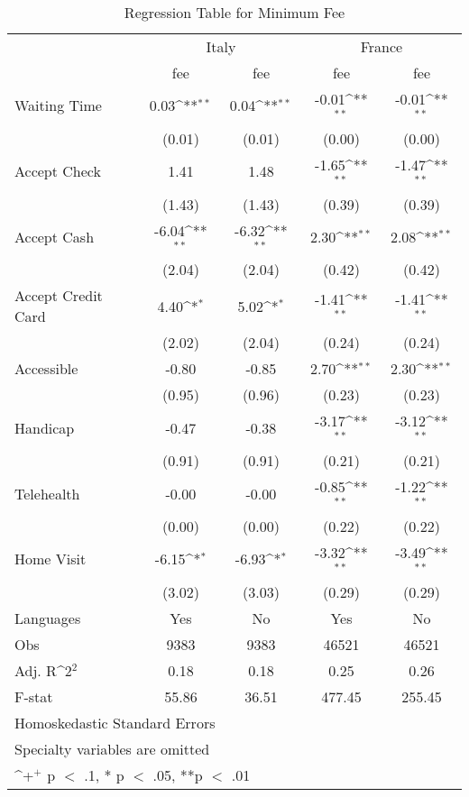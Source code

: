 \begin{table}[]
\caption{Regression Table for Minimum Fee}
{
\def\sym#1{\ifmmode^{#1}\else\(^{#1}\)\fi}
\begin{tabular}{@{\extracolsep{2pt}}l*{4}{c}@{}}
\hline\hline
& \multicolumn{2}{c}{Italy} & \multicolumn{2}{c}{France} \\
\cline{2-3}
\cline{4-5}
 & fee & fee & fee & fee \\
\hline
Waiting Time & 0.03\sym{**} & 0.04\sym{**} & -0.01\sym{**} & -0.01\sym{**} \\
 & (0.01) & (0.01) & (0.00) & (0.00) \\
Accept Check & 1.41 & 1.48 & -1.65\sym{**} & -1.47\sym{**} \\
 & (1.43) & (1.43) & (0.39) & (0.39) \\
Accept Cash & -6.04\sym{**} & -6.32\sym{**} & 2.30\sym{**} & 2.08\sym{**} \\
 & (2.04) & (2.04) & (0.42) & (0.42) \\
Accept Credit Card & 4.40\sym{*} & 5.02\sym{*} & -1.41\sym{**} & -1.41\sym{**} \\
 & (2.02) & (2.04) & (0.24) & (0.24) \\
Accessible & -0.80 & -0.85 & 2.70\sym{**} & 2.30\sym{**} \\
 & (0.95) & (0.96) & (0.23) & (0.23) \\
Handicap & -0.47 & -0.38 & -3.17\sym{**} & -3.12\sym{**} \\
 & (0.91) & (0.91) & (0.21) & (0.21) \\
Telehealth & -0.00 & -0.00 & -0.85\sym{**} & -1.22\sym{**} \\
 & (0.00) & (0.00) & (0.22) & (0.22) \\
Home Visit & -6.15\sym{*} & -6.93\sym{*} & -3.32\sym{**} & -3.49\sym{**} \\
 & (3.02) & (3.03) & (0.29) & (0.29) \\
Languages & Yes & No & Yes & No \\

\hline
Obs & 9383 & 9383 & 46521 & 46521 \\
Adj. R\sym{2} & 0.18 & 0.18 & 0.25 & 0.26 \\
F-stat & 55.86 & 36.51 & 477.45 & 255.45 \\
\hline\hline
\multicolumn{5}{l}{\footnotesize Homoskedastic Standard Errors}\vspace{-.25em} \\
\multicolumn{5}{l}{\footnotesize Specialty variables are omitted}\vspace{-.25em} \\
\multicolumn{5}{l}{\footnotesize \sym{+} p $<$ .1, * p $<$ .05, **p $<$ .01}
\end{tabular}
}
\end{table}